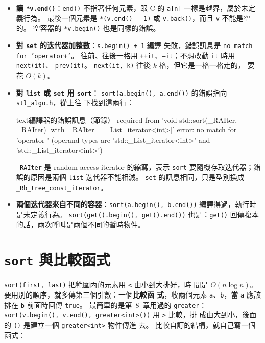 \begin{itemize}
\item \textbf{讀 \texttt{*v.end()}}：\texttt{end()} 不指著任何元素，跟
C 的 \texttt{a[n]} 一樣是越界，屬於未定義行為。 最後一個元素是
\texttt{*(v.end() - 1)} 或 \texttt{v.back()}，而且 \texttt{v} 不能是空的。
空容器的 \texttt{*v.begin()} 也是同樣的錯誤。
\item \textbf{對 \texttt{set} 的迭代器加整數}：\texttt{s.begin() + 1} 編譯
失敗，錯誤訊息是 \texttt{no match for 'operator+'}。 往前、往後一格用
\texttt{++it}、\texttt{--it}；不想改動 \texttt{it} 時用 \texttt{next(it)}、
\texttt{prev(it)}。 \texttt{next(it, k)} 往後 $k$ 格，但它是一格一格走的，
要花 $O(k)$。
\item \textbf{對 \texttt{list} 或 \texttt{set} 用 \texttt{sort}}：
\texttt{sort(a.begin(), a.end())} 的錯誤指向 \texttt{stl\_algo.h}，從上往
下找到這兩行：
\begin{code}{text}{編譯器的錯誤訊息（節錄）}
required from 'void std::sort(_RAIter, _RAIter) [with _RAIter = _List_iterator<int>]'
error: no match for 'operator-' (operand types are 'std::_List_iterator<int>' and 'std::_List_iterator<int>')
\end{code}
\texttt{\_RAIter} 是 random access iterator 的縮寫，表示 \texttt{sort}
要隨機存取迭代器；錯誤的原因是兩個 \texttt{list} 迭代器不能相減。
\texttt{set} 的訊息相同，只是型別換成 \texttt{\_Rb\_tree\_const\_iterator}。
\item \textbf{兩個迭代器來自不同的容器}：\texttt{sort(a.begin(), b.end())}
編譯得過，執行時是未定義行為。 \texttt{sort(get().begin(), get().end())}
也是：\texttt{get()} 回傳複本的話，兩次呼叫是兩個不同的暫時物件。
\end{itemize}

\section{\texttt{sort} 與比較函式}
\label{sec:sort}

\texttt{sort(first, last)} 把範圍內的元素用 \texttt{<} 由小到大排好，時
間是 $O(n \log n)$。 要用別的順序，就多傳第三個引數：一個\textbf{比較函
式}，收兩個元素 \texttt{a}、\texttt{b}，當 \texttt{a} 應該排在 \texttt{b}
前面時回傳 \texttt{true}。 最簡單的是第~8~章用過的 \texttt{greater}：
\texttt{sort(v.begin(), v.end(), greater<int>())} 用 \texttt{>} 比較，排
成由大到小，後面的 \texttt{()} 是建立一個 \texttt{greater<int>} 物件傳進
去。 比較自訂的結構，就自己寫一個函式：

